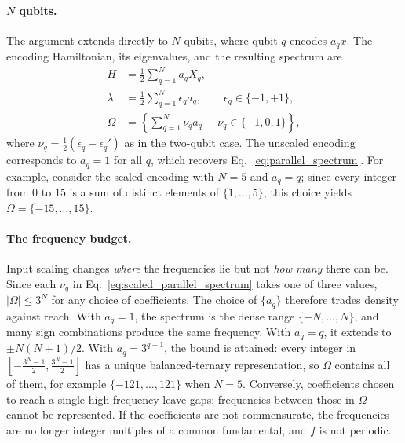 \documentclass[12pt]{article}
\numberwithin{equation}{section}  %
\begin{document}
\paragraph{$N$ qubits.} The argument extends directly to $N$ qubits, where qubit $q$ encodes $a_q x$. The encoding Hamiltonian, its eigenvalues, and the resulting spectrum are
\begin{equation}
\begin{aligned}
H &= \frac{1}{2}\sum_{q=1}^{N} a_q X_q, \\
\lambda &= \frac{1}{2}\sum_{q=1}^{N} \epsilon_q a_q, \qquad \epsilon_q \in \{-1, +1\}, \\
\Omega &= \left\{ \sum_{q=1}^{N} \nu_q a_q \;\middle|\; \nu_q \in \{-1, 0, 1\} \right\},
\end{aligned}
\label{eq:scaled_parallel_spectrum}
\end{equation}
where $\nu_q = \frac{1}{2}(\epsilon_q - \epsilon_q')$ as in the two-qubit case. The unscaled encoding corresponds to $a_q = 1$ for all $q$, which recovers Eq.~\eqref{eq:parallel_spectrum}. For example, consider the scaled encoding with $N = 5$ and $a_q = q$; since every integer from $0$ to $15$ is a sum of distinct elements of $\{1, \ldots, 5\}$, this choice yields $\Omega = \{-15, \ldots, 15\}$.

\paragraph{The frequency budget.} Input scaling changes \emph{where} the frequencies lie but not \emph{how many} there can be. Since each $\nu_q$ in Eq.~\eqref{eq:scaled_parallel_spectrum} takes one of three values, $|\Omega| \le 3^N$ for any choice of coefficients. The choice of $\{a_q\}$ therefore trades density against reach. With $a_q = 1$, the spectrum is the dense range $\{-N, \ldots, N\}$, and many sign combinations produce the same frequency. With $a_q = q$, it extends to $\pm N(N+1)/2$. With $a_q = 3^{q-1}$, the bound is attained: every integer in $[-\frac{3^N-1}{2}, \frac{3^N-1}{2}]$ has a unique balanced-ternary representation, so $\Omega$ contains all of them, for example $\{-121, \ldots, 121\}$ when $N = 5$. Conversely, coefficients chosen to reach a single high frequency leave gaps: frequencies between those in $\Omega$ cannot be represented. If the coefficients are not commensurate, the frequencies are no longer integer multiples of a common fundamental, and $f$ is not periodic.
\end{document}

